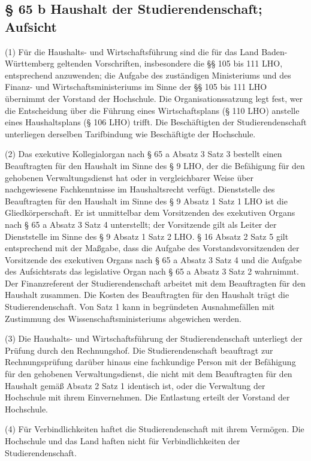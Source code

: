 \documentclass[
10pt,
a4paper,
twoside,								%
titlepage=false,							%
draft=false								%
]{scrartcl}
\begin{document}
\subsection{§ 65 b Haushalt der Studierendenschaft; Aufsicht}

(1) Für die Haushalts- und Wirtschaftsführung sind die für das Land Baden-Württemberg geltenden Vorschriften, insbesondere die §§ 105 bis 111 LHO, entsprechend anzuwenden; die Aufgabe des zuständigen Ministeriums und des Finanz- und Wirtschaftsministeriums im Sinne der §§ 105 bis 111 LHO übernimmt der Vorstand der Hochschule. Die Organisationssatzung legt fest, wer die Entscheidung über die Führung eines Wirtschaftsplans (§ 110 LHO) anstelle eines Haushaltsplans (§ 106 LHO) trifft. Die Beschäftigten der Studierendenschaft unterliegen derselben Tarifbindung wie Beschäftigte der Hochschule.

(2) Das exekutive Kollegialorgan nach § 65 a Absatz 3 Satz 3 bestellt einen Beauftragten für den Haushalt im Sinne des § 9 LHO, der die Befähigung für den gehobenen Verwaltungsdienst hat oder in vergleichbarer Weise über nachgewiesene Fachkenntnisse im Haushaltsrecht verfügt. Dienststelle des Beauftragten für den Haushalt im Sinne des § 9 Absatz 1 Satz 1 LHO ist die Gliedkörperschaft. Er ist unmittelbar dem Vorsitzenden des exekutiven Organs nach § 65 a Absatz 3 Satz 4 unterstellt; der Vorsitzende gilt als Leiter der Dienststelle im Sinne des § 9 Absatz 1 Satz 2 LHO. § 16 Absatz 2 Satz 5 gilt entsprechend mit der Maßgabe, dass die Aufgabe des Vorstandsvorsitzenden der Vorsitzende des exekutiven Organs nach § 65 a Absatz 3 Satz 4 und die Aufgabe des Aufsichtsrats das legislative Organ nach § 65 a Absatz 3 Satz 2 wahrnimmt. Der Finanzreferent der Studierendenschaft arbeitet mit dem Beauftragten für den Haushalt zusammen. Die Kosten des Beauftragten für den Haushalt trägt die Studierendenschaft. Von Satz 1 kann in begründeten Ausnahmefällen mit Zustimmung des Wissenschaftsministeriums abgewichen werden.

(3) Die Haushalts- und Wirtschaftsführung der Studierendenschaft unterliegt der Prüfung durch den Rechnungshof. Die Studierendenschaft beauftragt zur Rechnungsprüfung darüber hinaus eine fachkundige Person mit der Befähigung für den gehobenen Verwaltungsdienst, die nicht mit dem Beauftragten für den Haushalt gemäß Absatz 2 Satz 1 identisch ist, oder die Verwaltung der Hochschule mit ihrem Einvernehmen. Die Entlastung erteilt der Vorstand der Hochschule.

(4) Für Verbindlichkeiten haftet die Studierendenschaft mit ihrem Vermögen. Die Hochschule und das Land haften nicht für Verbindlichkeiten der Studierendenschaft.
\end{document}

